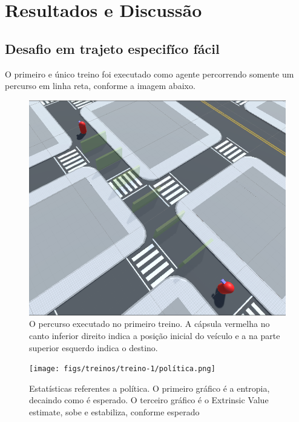 \chapter{Resultados e Discussão}\label{cap:resultados}

\section{Desafio em trajeto especifíco fácil}

O primeiro e único treino foi executado como agente percorrendo somente um percurso em linha reta, conforme a imagem abaixo.

\begin{figure}[h]
    \centering
    \includegraphics[scale=0.25]{figs/rotas/path_14.png}
     \caption{O percurso executado no primeiro treino. A cápsula vermelha no canto inferior direito indica a posição inicial do veículo e a na parte superior esquerdo indica o destino.}
     \label{fig:rota-1}
\end{figure}
 
\begin{figure}[h]
    \centering
    \texttt{[image: figs/treinos/treino-1/política.png]}
     \caption{Estatísticas referentes a política. O primeiro gráfico é a entropia, decaindo como é esperado. O terceiro gráfico é o Extrinsic Value estimate, sobe e estabiliza, conforme esperado}
     \label{fig:treino-1-politica}
\end{figure}


